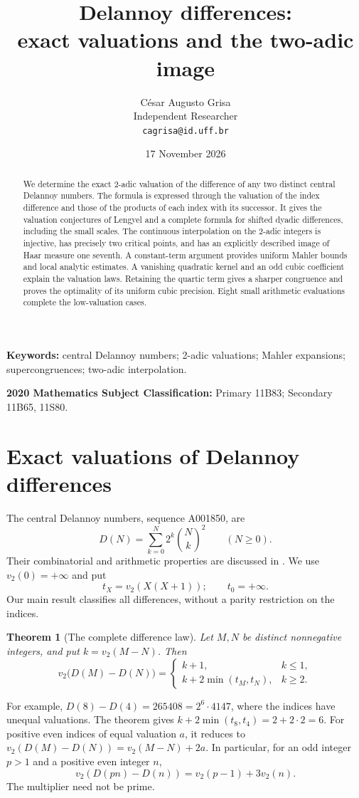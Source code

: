 \documentclass[11pt]{article}
\title{Delannoy differences:\\exact valuations and the two-adic image}
\author{C\'esar Augusto Grisa\\{\small Independent Researcher}\\{\small\texttt{cagrisa@id.uff.br}}}
\date{17 November 2026}
\newtheorem{theorem}{Theorem}
\theoremstyle{remark}\newtheorem{remark}[theorem]{Remark}
\begin{document}
\maketitle
\begin{abstract}
We determine the exact 2-adic valuation of the difference of any two
distinct central Delannoy numbers. The formula is expressed through the
valuation of the index difference and those of the products of each
index with its successor. It gives the valuation conjectures of Lengyel
and a complete formula for shifted dyadic differences, including the
small scales. The continuous interpolation on the 2-adic integers is
injective, has precisely two critical points, and has an explicitly
described image of Haar measure one seventh. A constant-term argument
provides uniform Mahler bounds and local analytic estimates. A vanishing
quadratic kernel and an odd cubic coefficient explain the valuation
laws. Retaining the quartic term gives a sharper congruence and proves
the optimality of its uniform cubic precision. Eight small arithmetic
evaluations complete the low-valuation cases.
\end{abstract}
\noindent\textbf{Keywords:} central Delannoy numbers; 2-adic valuations;
Mahler expansions; supercongruences; two-adic interpolation.

\noindent\textbf{2020 Mathematics Subject Classification:}
Primary 11B83; Secondary 11B65, 11S80.


\section{Exact valuations of Delannoy differences}
The central Delannoy numbers, sequence A001850, are
\[
D(N)=\sum_{k=0}^N2^k\binom Nk^2\qquad(N\ge0).
\]
Their combinatorial and arithmetic properties are discussed in
\cite{Sulanke2003,BanderierSchwer2005,Sun2018,Lengyel2021}.
We use $v_2(0)=+\infty$ and put
\[
 t_X=v_2(X(X+1));\qquad t_0=+\infty.
\]
Our main result classifies all differences, without a parity restriction
on the indices.

\begin{theorem}[The complete difference law]\label{thm:pairs}
Let $M,N$ be distinct nonnegative integers, and put $k=v_2(M-N)$.
Then
\[
 v_2\bigl(D(M)-D(N)\bigr)=
 \begin{cases}
 k+1,&k\le1,\\
 k+2\min(t_M,t_N),&k\ge2.
 \end{cases}
\]
\end{theorem}
For example, $D(8)-D(4)=265408=2^6\cdot4147$, where the
indices have unequal valuations. The theorem gives
$k+2\min(t_8,t_4)=2+2\cdot2=6$.
For positive even indices of equal valuation $a$, it reduces to
$v_2(D(M)-D(N))=v_2(M-N)+2a$. In particular, for an odd
integer $p>1$ and a positive even integer $n$,
\[
 v_2(D(pn)-D(n))=v_2(p-1)+3v_2(n).
\]
The multiplier need not be prime.
\end{document}
